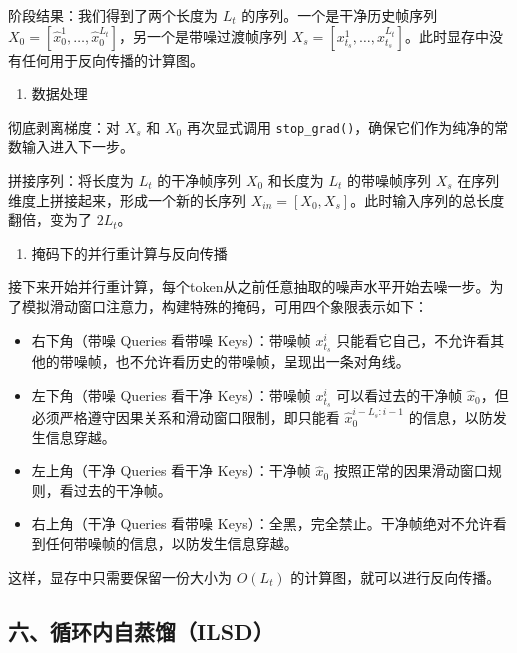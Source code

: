 阶段结果：我们得到了两个长度为 \(L_t\) 的序列。一个是干净历史帧序列 \(X_0=[\hat{x}_0^1,\ldots,\hat{x}_0^{L_t}]\)，另一个是带噪过渡帧序列 \(X_s=[x_{t_s}^1,\ldots,x_{t_s}^{L_t}]\)。此时显存中没有任何用于反向传播的计算图。

\begin{enumerate}
\def\labelenumi{\arabic{enumi}.}
\setcounter{enumi}{1}
\tightlist
\item
  数据处理
\end{enumerate}

彻底剥离梯度：对 \(X_s\) 和 \(X_0\) 再次显式调用 \texttt{stop\_grad()}，确保它们作为纯净的常数输入进入下一步。

拼接序列：将长度为 \(L_t\) 的干净帧序列 \(X_0\) 和长度为 \(L_t\) 的带噪帧序列 \(X_s\) 在序列维度上拼接起来，形成一个新的长序列 \(X_{in}=[X_0,X_s]\)。此时输入序列的总长度翻倍，变为了 \(2L_t\)。

\begin{enumerate}
\def\labelenumi{\arabic{enumi}.}
\setcounter{enumi}{2}
\tightlist
\item
  掩码下的并行重计算与反向传播
\end{enumerate}

接下来开始并行重计算，每个token从之前任意抽取的噪声水平开始去噪一步。为了模拟滑动窗口注意力，构建特殊的掩码，可用四个象限表示如下：

\begin{itemize}
\tightlist
\item
  右下角（带噪 Queries 看带噪 Keys）：带噪帧 \(x_{t_s}^i\) 只能看它自己，不允许看其他的带噪帧，也不允许看历史的带噪帧，呈现出一条对角线。
\item
  左下角（带噪 Queries 看干净 Keys）：带噪帧 \(x_{t_s}^i\) 可以看过去的干净帧 \(\hat{x}_0\)，但必须严格遵守因果关系和滑动窗口限制，即只能看 \(\hat{x}_0^{i-L_s:i-1}\) 的信息，以防发生信息穿越。
\item
  左上角（干净 Queries 看干净 Keys）：干净帧 \(\hat{x}_0\) 按照正常的因果滑动窗口规则，看过去的干净帧。
\item
  右上角（干净 Queries 看带噪 Keys）：全黑，完全禁止。干净帧绝对不允许看到任何带噪帧的信息，以防发生信息穿越。
\end{itemize}

这样，显存中只需要保留一份大小为 \(O(L_t)\) 的计算图，就可以进行反向传播。

\hypertarget{ux516dux5faaux73afux5185ux81eaux84b8ux998filsd}{%
\subsection{六、循环内自蒸馏（ILSD）}\label{ux516dux5faaux73afux5185ux81eaux84b8ux998filsd}}

